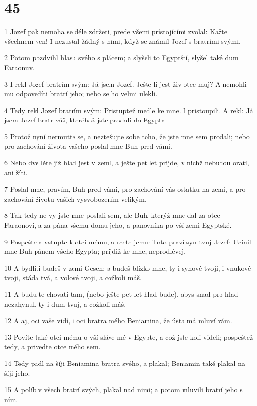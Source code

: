 \chapter{45}

\par 1 Jozef pak nemoha se déle zdržeti, prede všemi prístojícími zvolal: Kažte všechnem ven! I nezustal žádný s nimi, když se známil Jozef s bratrími svými.
\par 2 Potom pozdvihl hlasu svého s plácem; a slyšeli to Egyptští, slyšel také dum Faraonuv.
\par 3 I rekl Jozef bratrím svým: Já jsem Jozef. Ješte-li jest živ otec muj? A nemohli mu odpovedíti bratrí jeho; nebo se ho velmi ulekli.
\par 4 Tedy rekl Jozef bratrím svým: Pristuptež medle ke mne. I pristoupili. A rekl: Já jsem Jozef bratr váš, kteréhož jste prodali do Egypta.
\par 5 Protož nyní nermutte se, a neztežujte sobe toho, že jste mne sem prodali; nebo pro zachování života vašeho poslal mne Buh pred vámi.
\par 6 Nebo dve léte již hlad jest v zemi, a ješte pet let prijde, v nichž nebudou orati, ani žíti.
\par 7 Poslal mne, pravím, Buh pred vámi, pro zachování vás ostatku na zemi, a pro zachování životu vašich vysvobozením velikým.
\par 8 Tak tedy ne vy jste mne poslali sem, ale Buh, kterýž mne dal za otce Faraonovi, a za pána všemu domu jeho, a panovníka po vší zemi Egyptské.
\par 9 Pospešte a vstupte k otci mému, a rcete jemu: Toto praví syn tvuj Jozef: Ucinil mne Buh pánem všeho Egypta; prijdiž ke mne, neprodlévej.
\par 10 A bydliti budeš v zemi Gesen; a budeš blízko mne, ty i synové tvoji, i vnukové tvoji, stáda tvá, a volové tvoji, a cožkoli máš.
\par 11 A budu te chovati tam, (nebo ješte pet let hlad bude), abys snad pro hlad nezahynul, ty i dum tvuj, a cožkoli máš.
\par 12 A aj, oci vaše vidí, i oci bratra mého Beniamina, že ústa má mluví vám.
\par 13 Povíte také otci mému o vší sláve mé v Egypte, a což jste koli videli; pospeštež tedy, a privedte otce mého sem.
\par 14 Tedy padl na šíji Beniamina bratra svého, a plakal; Beniamin také plakal na šíji jeho.
\par 15 A políbiv všech bratrí svých, plakal nad nimi; a potom mluvili bratrí jeho s ním.
